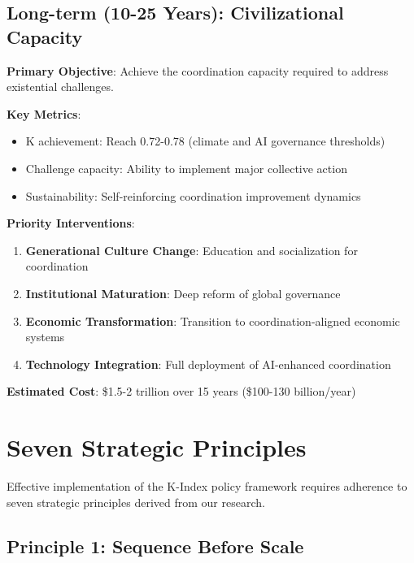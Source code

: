 \documentclass[12pt,letterpaper]{article}
\begin{document}
\subsection{Long-term (10-25 Years): Civilizational Capacity}

\textbf{Primary Objective}: Achieve the coordination capacity required to address existential challenges.

\textbf{Key Metrics}:
\begin{itemize}
    \item K achievement: Reach 0.72-0.78 (climate and AI governance thresholds)
    \item Challenge capacity: Ability to implement major collective action
    \item Sustainability: Self-reinforcing coordination improvement dynamics
\end{itemize}

\textbf{Priority Interventions}:

\begin{enumerate}
    \item \textbf{Generational Culture Change}: Education and socialization for coordination
    \item \textbf{Institutional Maturation}: Deep reform of global governance
    \item \textbf{Economic Transformation}: Transition to coordination-aligned economic systems
    \item \textbf{Technology Integration}: Full deployment of AI-enhanced coordination
\end{enumerate}

\textbf{Estimated Cost}: \$1.5-2 trillion over 15 years (\$100-130 billion/year)

\section{Seven Strategic Principles}

Effective implementation of the K-Index policy framework requires adherence to seven strategic principles derived from our research.

\subsection{Principle 1: Sequence Before Scale}
\end{document}
